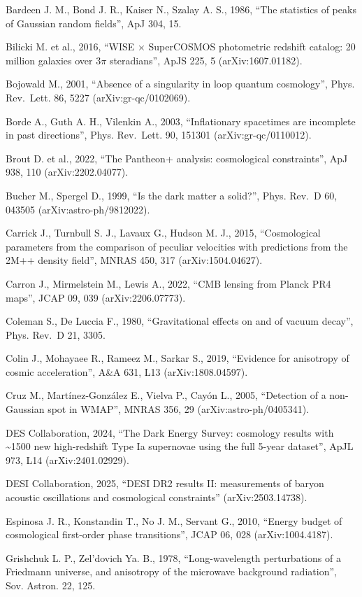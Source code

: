 \documentclass[
]{article}
\begin{document}
Bardeen J. M., Bond J. R., Kaiser N., Szalay A. S., 1986, ``The
statistics of peaks of Gaussian random fields'', ApJ 304, 15.

Bilicki M. et al., 2016, ``WISE × SuperCOSMOS photometric redshift
catalog: 20 million galaxies over \(3\pi\) steradians'', ApJS 225, 5
(arXiv:1607.01182).

Bojowald M., 2001, ``Absence of a singularity in loop quantum
cosmology'', Phys. Rev.~Lett. 86, 5227 (arXiv:gr-qc/0102069).

Borde A., Guth A. H., Vilenkin A., 2003, ``Inflationary spacetimes are
incomplete in past directions'', Phys. Rev.~Lett. 90, 151301
(arXiv:gr-qc/0110012).

Brout D. et al., 2022, ``The Pantheon+ analysis: cosmological
constraints'', ApJ 938, 110 (arXiv:2202.04077).

Bucher M., Spergel D., 1999, ``Is the dark matter a solid?'', Phys.
Rev.~D 60, 043505 (arXiv:astro-ph/9812022).

Carrick J., Turnbull S. J., Lavaux G., Hudson M. J., 2015,
``Cosmological parameters from the comparison of peculiar velocities
with predictions from the 2M++ density field'', MNRAS 450, 317
(arXiv:1504.04627).

Carron J., Mirmelstein M., Lewis A., 2022, ``CMB lensing from Planck PR4
maps'', JCAP 09, 039 (arXiv:2206.07773).

Coleman S., De Luccia F., 1980, ``Gravitational effects on and of vacuum
decay'', Phys. Rev.~D 21, 3305.

Colin J., Mohayaee R., Rameez M., Sarkar S., 2019, ``Evidence for
anisotropy of cosmic acceleration'', A\&A 631, L13 (arXiv:1808.04597).

Cruz M., Martínez-González E., Vielva P., Cayón L., 2005, ``Detection of
a non-Gaussian spot in WMAP'', MNRAS 356, 29 (arXiv:astro-ph/0405341).

DES Collaboration, 2024, ``The Dark Energy Survey: cosmology results
with \textasciitilde1500 new high-redshift Type Ia supernovae using the
full 5-year dataset'', ApJL 973, L14 (arXiv:2401.02929).

DESI Collaboration, 2025, ``DESI DR2 results II: measurements of baryon
acoustic oscillations and cosmological constraints'' (arXiv:2503.14738).

Espinosa J. R., Konstandin T., No J. M., Servant G., 2010, ``Energy
budget of cosmological first-order phase transitions'', JCAP 06, 028
(arXiv:1004.4187).

Grishchuk L. P., Zel'dovich Ya. B., 1978, ``Long-wavelength
perturbations of a Friedmann universe, and anisotropy of the microwave
background radiation'', Sov. Astron. 22, 125.
\end{document}
